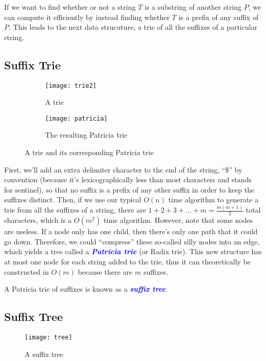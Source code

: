 \documentclass[11pt, oneside]{article}
\newcommand{\emphasis}[1]{\textcolor{blue}{\textbf{\textit{#1}}}}
\begin{document}
If we want to find whether or not a string \( T \) is a substring of another string \( P \),
we can compute it efficiently by instead finding whether \( T \) is a prefix of any suffix of \( P \).
This leads to the next data strucuture, a trie of all the suffixes of a particular string.

\subsection{Suffix Trie}

\begin{figure}[h!]
    \centering
    \begin{subfigure}[h]{0.4 \textwidth}
      \texttt{[image: trie2]}
      \caption{A trie}
    \end{subfigure}
    \hfill
    \begin{subfigure}[h]{0.4 \textwidth}
      \texttt{[image: patricia]}
      \caption{The resulting Patricia trie}
    \end{subfigure}
    \caption{A trie and its corresponding Patricia trie}
\end{figure}

First, we'll add an extra delimiter character to the end of the string,
``\$'' by convention (because it's lexicographically less than most characters and stands for sentinel),
so that no suffix is a prefix of any other suffix in order to keep the suffixes distinct.
Then, if we use our typical \( O(n) \) time algorithm to generate a trie from all the suffixes of a string,
there are \( 1 + 2 + 3 + \dots + m = \frac{m(m + 1)}{2} \) total characters,
which is a \( O(m^2) \) time algorithm. However, note that some nodes are useless.
If a node only has one child, then there's only one path that it could go down.
Therefore, we could ``compress'' these so-called silly nodes into an edge,
which yields a tree called a \emphasis{Patricia trie} (or Radix trie).
This new structure has at most one node for each string added to the trie,
thus it can theoretically be constructed in \( O(m) \) because there are \( m \) suffixes.

A Patricia trie of suffixes is known as a \emphasis{suffix tree}.

\subsection{Suffix Tree}

\begin{figure}[h!]
\centering
\texttt{[image: tree]}
\caption{A suffix tree}
\end{figure}
\end{document}
